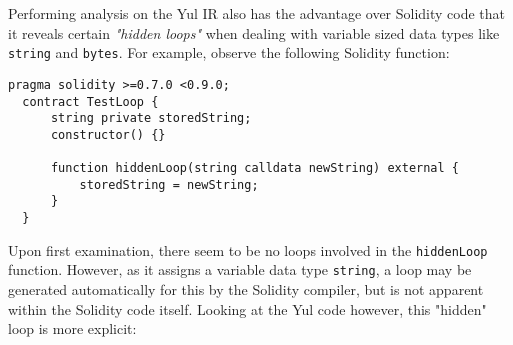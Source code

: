 Performing analysis on the Yul IR also has the advantage over Solidity code that it 
reveals certain \textit{"hidden loops"} when dealing with variable sized data types 
like \texttt{string} and \texttt{bytes}. For example, observe the following Solidity function:\\

\begin{lstlisting}[language=Solidity, caption={Where is the a loop within this contract?}, label={lst:sol_hiddenloop}, basicstyle=\ttfamily\scriptsize]
  pragma solidity >=0.7.0 <0.9.0;
  contract TestLoop {
      string private storedString;
      constructor() {}

      function hiddenLoop(string calldata newString) external {
          storedString = newString;
      }
  }
\end{lstlisting}

Upon first examination, there seem to be no loops involved in the \texttt{hiddenLoop} function. However,
as it assigns a variable data type \texttt{string}, a loop may be generated automatically for this by the 
Solidity compiler, but is not apparent within the Solidity code itself. Looking at the Yul code however,
this "hidden" loop is more explicit:\\

